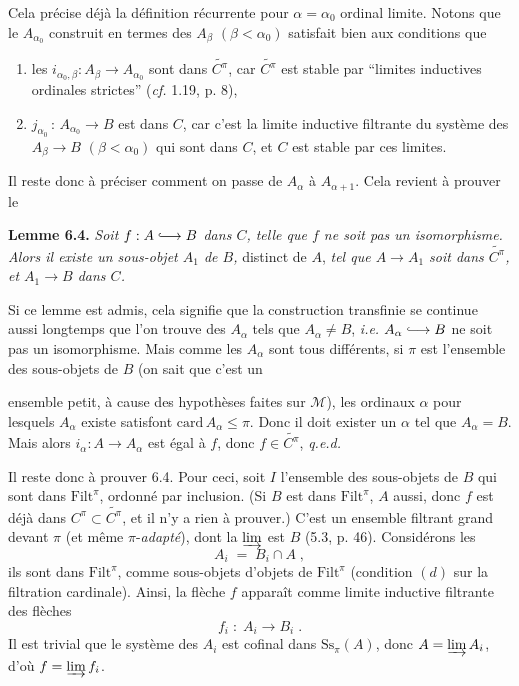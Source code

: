 \documentclass[11pt]{article}
\newcommand{\printedpage}[1]{\marginpar{\raggedright\footnotesize p.~#1}}
\newcommand{\msp}[1]{\marginpar{\raggedright\footnotesize [#1]}}
\newcommand{\Filt}{\mathrm{Filt}}
\newcommand{\Ss}{\mathrm{Ss}}
\newcommand{\M}{\mathcal{M}}
\newcommand{\into}{\lhook\joinrel\longrightarrow}
\begin{document}
\msp{page 79}
Cela précise déjà la définition récurrente pour $\alpha = \alpha_{0}$ ordinal limite. Notons que le $A_{\alpha_{0}}$ construit en termes des $A_{\beta}$ $(\beta < \alpha_{0})$ satisfait bien aux conditions que
\begin{enumerate}[label={}]
\item[\textit{a})] les $i_{\alpha_{0},\beta} : A_{\beta} \longrightarrow A_{\alpha_{0}}$ sont dans $\widetilde{C^{\pi}}$, car $\widetilde{C^{\pi}}$ est stable par ``limites inductives ordinales strictes'' (\textit{cf.} 1.19, p. 8),
\item[\textit{b})] $j_{\alpha_{0}} \, : \, A_{\alpha_{0}} \longrightarrow B$ est dans $C$, car c'est la limite inductive filtrante du système des $A_{\beta} \longrightarrow B$ $(\beta < \alpha_{0})$ qui sont dans $C$, et $C$ est stable par ces limites.
\end{enumerate}
Il reste donc à préciser comment on passe de $A_{\alpha}$ à $A_{\alpha+1}$. Cela revient à prouver le

\textbf{Lemme 6.4.} \textit{Soit $f : A \into B$ dans $C$, telle que $f$ ne soit pas un isomorphisme. Alors il existe un sous-objet $A_{1}$ de $B$,} distinct de $A$, \textit{tel que $A \longrightarrow A_{1}$ soit dans $\widetilde{C^{\pi}}$, et $A_{1} \longrightarrow B$ dans $C$.}

Si ce lemme est admis, cela signifie que la construction transfinie se continue aussi longtemps que l'on trouve des $A_{\alpha}$ tels que $A_{\alpha} \neq B$, \textit{i.e.} $A_{\alpha} \into B$ ne soit pas un isomorphisme. Mais comme les $A_{\alpha}$ sont tous différents, si $\pi$ est l'ensemble des sous-objets de $B$ (on sait que c'est un

\printedpage{44}

\msp{page 80}
ensemble petit, à cause des hypothèses faites sur $\M$), les ordinaux $\alpha$ pour lesquels $A_\alpha$ existe satisfont $\mathrm{card}\,A_\alpha \leq \pi$. Donc il doit exister un $\alpha$ tel que $A_\alpha = B$. Mais alors $i_\alpha : A \longrightarrow A_\alpha$ est égal à $f$, donc $f \in \widetilde{C^{\pi}}$, \quad \textit{q.e.d.}

Il reste donc à prouver 6.4. Pour ceci, soit $I$ l'ensemble des sous-objets de $B$ qui sont dans $\Filt^{\pi}$, ordonné par inclusion. (Si $B$ est dans $\Filt^{\pi}$, $A$ aussi, donc $f$ est déjà dans $C^{\pi} \subset \widetilde{C^{\pi}}$, et il n'y a rien à prouver.) C'est un ensemble filtrant grand devant $\pi$ (et même $\pi$-\textit{adapté}), dont la $\varinjlim$ est $B$ (5.3, p. 46). Considérons les
\[
A_i \;=\; B_i \cap A \;,
\]
ils sont dans $\Filt^{\pi}$, comme sous-objets d'objets de $\Filt^{\pi}$ (condition $(d)$ sur la filtration cardinale). Ainsi, la flèche $f$ apparaît comme limite inductive filtrante des flèches
\[
f_i \;:\; A_i \longrightarrow B_i \;.
\]
Il est trivial que le système des $A_i$ est cofinal dans $\Ss_{\pi}(A)$, donc $A = \varinjlim A_i$, d'où $f = \varinjlim f_i$.
\end{document}
